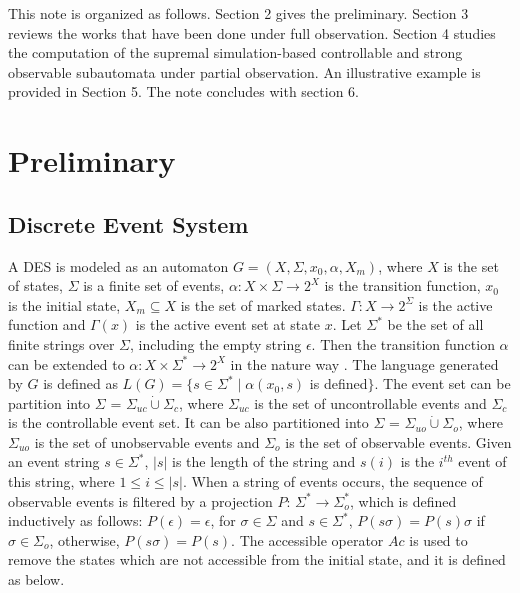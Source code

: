 \documentclass[12pt,draftcls,onecolumn]{IEEEtran}
\begin{document}
This note is organized as follows. Section 2 gives the
preliminary. Section 3 reviews the works that have been done under
full observation. Section 4 studies the computation of the
supremal simulation-based controllable and strong observable
subautomata under partial observation. An illustrative example is
provided in Section 5. The note concludes with section 6.


\section{Preliminary}
\subsection{Discrete Event System}
A DES is modeled as an automaton $G =(X,\Sigma,x_{0},\alpha,
X_{m})$, where $X$ is the set of states, $\Sigma$ is a finite set
of events, $\alpha: X \times \Sigma \rightarrow 2^X$ is the
transition function, $x_0$ is the initial state, $X_m \subseteq X$
is the set of marked states. $\Gamma: X \rightarrow 2^{\Sigma}$ is
the active function and $\Gamma(x)$ is the active event set at
state $x$. Let $\Sigma^{*}$ be the set of all finite strings over
$\Sigma$, including the empty string $\epsilon$. Then the
transition function $\alpha$ can be extended to $\alpha: X \times
\Sigma^{*} \rightarrow 2^{X}$ in the nature way \cite{cc}. The
language generated by $G$ is defined as $L(G)=\{s \in \Sigma^{*}
\mid \alpha(x_0, s)$ is defined$\}$. The event set can be
partition into $\Sigma$ = $\Sigma_{uc}\dot{ \cup} \Sigma_{c}$,
where $\Sigma_{uc}$ is the set of uncontrollable events and
$\Sigma_{c}$ is the controllable event set. It can be also
partitioned into $\Sigma$ = $\Sigma_{uo} \dot{\cup} \Sigma_{o}$,
where $\Sigma_{uo}$ is the set of unobservable events and
$\Sigma_{o}$ is the set of observable events. Given an event
string $s \in \Sigma^*$, $|s|$ is the length of the string and
$s(i)$ is the $i^{th}$ event of this string, where $1 \leq i \leq
|s|$. When a string of events occurs, the sequence of observable
events is filtered by a projection $P$: $\Sigma^{*} \rightarrow
\Sigma_{o}^{*}$, which is defined inductively as follows:
$P(\epsilon)=\epsilon$, for $\sigma \in \Sigma$ and $s \in
\Sigma^{*}$, $P(s\sigma)=P(s)\sigma$ if $\sigma \in \Sigma_o$,
otherwise, $P(s\sigma)=P(s)$. The accessible operator $Ac$ is used
to remove the states which are not accessible from the initial
state, and it is defined as below.
\end{document}
